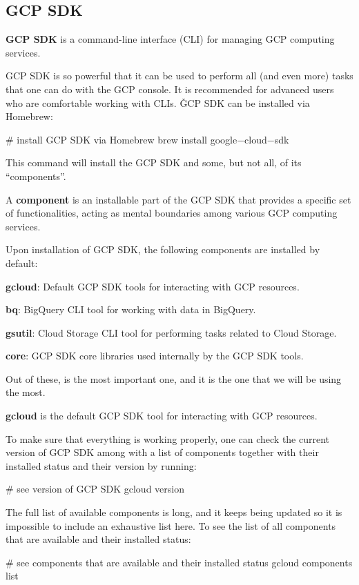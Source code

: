 \subsection{GCP SDK}

\textbf{GCP SDK} is a command-line interface (CLI) for managing GCP computing services.
\ed

GCP SDK is so powerful that it can be used to perform all (and even more) tasks that one can do with the GCP console.
It is recommended for advanced users who are comfortable working with CLIs. \v

GCP SDK can be installed via Homebrew:
\begin{bash}
# install GCP SDK via Homebrew
brew install google$-$cloud$-$sdk
\end{bash}

This command will install the GCP SDK and some, but not all, of its ``components''.

\bd[Component]
A \textbf{component} is an installable part of the GCP SDK that provides a specific set of functionalities, acting as
mental boundaries among various GCP computing services.
\ed

Upon installation of GCP SDK, the following components are installed by default:
\bit
\item \textbf{gcloud}: Default GCP SDK tools for interacting with GCP resources.
\item \textbf{bq}: BigQuery CLI tool for working with data in BigQuery.
\item \textbf{gsutil}: Cloud Storage CLI tool for performing tasks related to Cloud Storage.
\item \textbf{core}: GCP SDK core libraries used internally by the GCP SDK tools.
\eit

Out of these,  is the most important one, and it is the one that we will be using the most.

\bd[gcloud]
\textbf{gcloud} is the default GCP SDK tool for interacting with GCP resources.
\ed

To make sure that everything is working properly, one can check the current version of GCP SDK among with a list of
components together with their installed status and their version by running:
\begin{bash}
# see version of GCP SDK
gcloud version
\end{bash}

The full list of available components is long, and it keeps being updated so it is impossible to include an exhaustive
list here. To see the list of all components that are available and their installed status:
\begin{bash}
# see components that are available and their installed status
gcloud components list
\end{bash}

